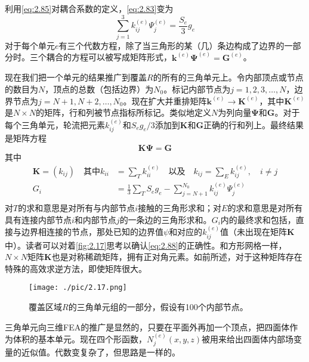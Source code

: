 \documentclass[12pt]{book}
\numberwithin{equation}{chapter}
\numberwithin{figure}{chapter}
\numberwithin{footnote}{page}
\begin{document}
利用\autoref{eq:2.85}对耦合系数的定义，\autoref{eq:2.83}变为
\begin{equation}\label{eq:2.86}
    \sum_{j=1}^3 k_{ij}^{(e)}\Psi_j^{(e)}=\frac{S_e}{3}g_e
\end{equation}
对于每个单元$e$有三个代数方程，除了当三角形的某（几）条边构成了边界的一部分时。三个耦合的方程可以被写成矩阵形式，$\mathbf{k}^{(e)}\boldsymbol{\Psi}^{(e)}=\mathbf{G}^{(e)}$。

现在我们把一个单元的结果推广到覆盖$R$的所有的三角单元上。令内部顶点或节点的数目为$N$，顶点的总数（包括边界）为$N_0$。标记内部节点为$j=1,2,3,\dots,N$，边界节点为$j=N+1,N+2,\dots,N_0$。现在扩大并重排矩阵$\mathbf{k}^{(e)}\to\mathbf{K}^{(e)}$，其中$\mathbf{K}^{(e)}$是$N\times N$的矩阵，行和列被节点指标所标记。类似地定义$N$为列向量$\boldsymbol{\Psi}$和$\mathbf{G}$。对于每个三角单元，轮流把元素$k_{ij}^{(e)}$和$S_eg_e/3$添加到$\mathbf{K}$和$\mathbf{G}$正确的行和列上。最终结果是矩阵方程
\begin{equation}\label{eq:2.87}
    \mathbf{K}\boldsymbol{\Psi}=\mathbf{G}
\end{equation}
其中
\begin{equation}\label{eq:2.88}
    \begin{aligned}
        \mathbf{K}=(k_{ij})\quad \mbox{其中}k_{ii}&=\sum_T k_{ii}^{(e)} \quad \mbox{以及} \quad k_{ij}=\sum_E k_{ij}^{(e)},\quad i\neq j\\
        G_i&=\frac{1}{3}\sum_T S_eg_e-\sum_{j=N+1}^{N_0} k_{ij}^{(e)}\Psi_j^{(e)}\\
    \end{aligned}
\end{equation}
对$T$的求和意思是对所有与内部节点$i$接触的三角形求和；对$E$的求和意思是对所有具有连接内部节点$i$和内部节点$j$的一条边的三角形求和。$G_i$内的最终求和包括，直接与边界相连接的节点，那处已知的边界值$\psi$和对应的$k_{ij}^{(e)}$值（未出现在矩阵$\mathbf{K}$中）。读者可以对着\autoref{fig:2.17}思考以确认\autoref{eq:2.88}的正确性。和方形网格一样，$N\times N$矩阵$\mathbf{K}$也是对称稀疏矩阵，拥有正对角元素。如前所述，对于这种矩阵存在特殊的高效求逆方法，即使矩阵很大。

\begin{figure}[!ht]
    \centering
    \texttt{[image: ./pic/2.17.png]}
    \captionsetup{justification=raggedright, singlelinecheck=false}
    \caption{覆盖区域$R$的三角单元组的一部分，假设有100个内部节点。}
    \label{fig:2.17}
\end{figure}

三角单元向三维FEA的推广是显然的，只要在平面外再加一个顶点，把四面体作为体积的基本单元。现在四个形函数，$N_j^{(e)}(x,y,z)$被用来给出四面体内部场变量的近似值。代数变复杂了，但思路是一样的。
\end{document}
